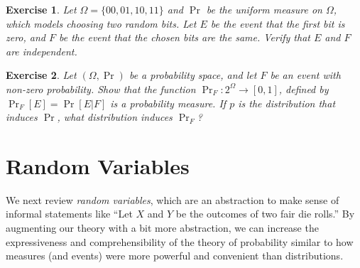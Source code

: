 \documentclass[11pt]{article}
\newtheorem{exercise}{Exercise}
\begin{document}
\begin{exercise}
    Let $\Omega=\{00,01,10,11\}$ and $\Pr$ be the uniform measure on $\Omega$,
    which models choosing two random bits.
    Let $E$ be the event that the  first bit is zero, and $F$ be the
    event that the chosen bits are the same. Verify that $E$ and $F$ are
    independent.
\end{exercise}


\begin{exercise}
    Let $(\Omega,\Pr)$ be a probability space, and let $F$ be an event
    with non-zero probability. Show that the function $\Pr_F:2^\Omega\to[0,1]$,
    defined by $\Pr_F[E] = \Pr[E|F]$ is a probability measure. If $p$
    is the distribution that induces $\Pr$, what distribution induces
    $\Pr_F$?
\end{exercise}


\section{Random Variables}

We next review \emph{random variables}, which are an abstraction to make sense
of informal statements like ``Let $X$ and $Y$ be the outcomes of two fair die
rolls.'' By augmenting our theory with a bit more abstraction, we can increase
the expressiveness and comprehensibility of the theory of probability similar
to how measures (and events) were more powerful and convenient than
distributions.
\end{document}
